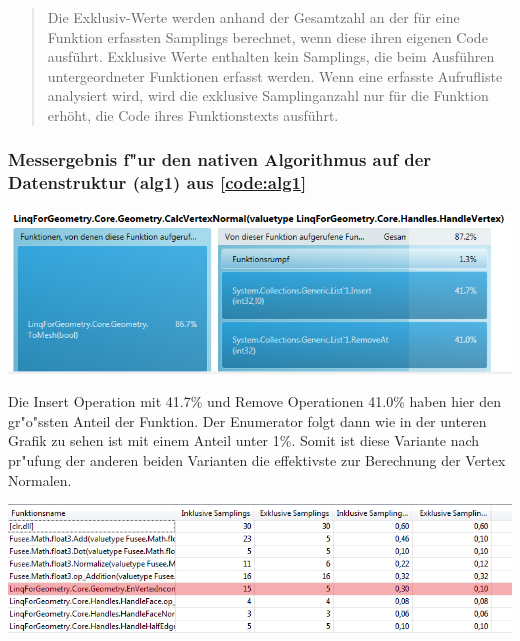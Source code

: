 \documentclass[pagesize, paper=a4, fontsize=12pt,titlepage=true, headings=small, headnosepline, abstractoff, liststotoc, nochapterprefix, plainheadsepline]{scrreprt}
\begin{document}
\begin{quote}Die Exklusiv-Werte werden anhand der Gesamtzahl an der f{\"u}r eine Funktion erfassten Samplings berechnet, wenn diese ihren eigenen Code ausf{\"u}hrt. Exklusive Werte enthalten kein Samplings, die beim Ausf{\"u}hren untergeordneter Funktionen erfasst werden. Wenn eine erfasste Aufrufliste analysiert wird, wird die exklusive Samplinganzahl nur f{\"u}r die Funktion erh{\"o}ht, die Code ihres Funktionstexts ausf{\"u}hrt. \cite[Analyse von Leistungsdaten]{MicrosoftCReferenz.2013}\end{quote}

\subsubsection{Messergebnis f"ur den nativen Algorithmus auf der Datenstruktur (alg1) aus \ref{code:alg1}}
\begin{minipage}[c][7cm]{\linewidth}
\includegraphics[width=\linewidth]{../Messung/linq-alg1-0}
\label{messung:alg10}
\end{minipage}
Die Insert Operation mit 41.7\% und Remove Operationen  41.0\% haben hier den gr"o"ssten Anteil der Funktion. Der Enumerator folgt dann wie in der unteren Grafik zu sehen ist mit einem Anteil unter 1\%. Somit ist diese Variante nach pr"ufung der anderen beiden Varianten die effektivste zur Berechnung der Vertex Normalen.
\begin{minipage}[c][7cm]{\linewidth}
\includegraphics[width=\linewidth]{../Messung/linq-alg1-1}
\label{messung:alg11}
\end{minipage}
\end{document}
